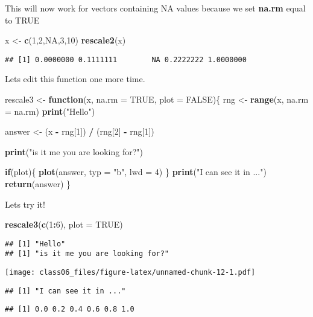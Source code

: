 \documentclass[]{article}
\newenvironment{Shaded}{\begin{snugshade}}{\end{snugshade}}
\newcommand{\KeywordTok}[1]{\textcolor[rgb]{0.13,0.29,0.53}{\textbf{#1}}}
\newcommand{\DataTypeTok}[1]{\textcolor[rgb]{0.13,0.29,0.53}{#1}}
\newcommand{\DecValTok}[1]{\textcolor[rgb]{0.00,0.00,0.81}{#1}}
\newcommand{\StringTok}[1]{\textcolor[rgb]{0.31,0.60,0.02}{#1}}
\newcommand{\OtherTok}[1]{\textcolor[rgb]{0.56,0.35,0.01}{#1}}
\newcommand{\ControlFlowTok}[1]{\textcolor[rgb]{0.13,0.29,0.53}{\textbf{#1}}}
\newcommand{\OperatorTok}[1]{\textcolor[rgb]{0.81,0.36,0.00}{\textbf{#1}}}
\newcommand{\NormalTok}[1]{#1}
\begin{document}
This will now work for vectors containing NA values because we set
\textbf{na.rm} equal to TRUE

\begin{Shaded}
\begin{Highlighting}[]
\NormalTok{x <-}\StringTok{ }\KeywordTok{c}\NormalTok{(}\DecValTok{1}\NormalTok{,}\DecValTok{2}\NormalTok{,}\OtherTok{NA}\NormalTok{,}\DecValTok{3}\NormalTok{,}\DecValTok{10}\NormalTok{)}
\KeywordTok{rescale2}\NormalTok{(x)}
\end{Highlighting}
\end{Shaded}

\begin{verbatim}
## [1] 0.0000000 0.1111111        NA 0.2222222 1.0000000
\end{verbatim}

Lets edit this function one more time.

\begin{Shaded}
\begin{Highlighting}[]
\NormalTok{rescale3 <-}\StringTok{ }\ControlFlowTok{function}\NormalTok{(x, }\DataTypeTok{na.rm =} \OtherTok{TRUE}\NormalTok{, }\DataTypeTok{plot =} \OtherTok{FALSE}\NormalTok{)\{}
\NormalTok{  rng <-}\StringTok{ }\KeywordTok{range}\NormalTok{(x, }\DataTypeTok{na.rm =}\NormalTok{ na.rm)}
  \KeywordTok{print}\NormalTok{(}\StringTok{"Hello"}\NormalTok{)}
  
\NormalTok{  answer <-}\StringTok{ }\NormalTok{(x }\OperatorTok{-}\StringTok{ }\NormalTok{rng[}\DecValTok{1}\NormalTok{]) }\OperatorTok{/}\StringTok{ }\NormalTok{(rng[}\DecValTok{2}\NormalTok{] }\OperatorTok{-}\StringTok{ }\NormalTok{rng[}\DecValTok{1}\NormalTok{])}
  
  \KeywordTok{print}\NormalTok{(}\StringTok{"is it me you are looking for?"}\NormalTok{)}
  
  \ControlFlowTok{if}\NormalTok{(plot)\{}
    \KeywordTok{plot}\NormalTok{(answer, }\DataTypeTok{typ =} \StringTok{"b"}\NormalTok{, }\DataTypeTok{lwd =} \DecValTok{4}\NormalTok{)}
\NormalTok{  \}}
  \KeywordTok{print}\NormalTok{(}\StringTok{"I can see it in ..."}\NormalTok{)}
  \KeywordTok{return}\NormalTok{(answer)}
\NormalTok{\}}
\end{Highlighting}
\end{Shaded}

Lets try it!

\begin{Shaded}
\begin{Highlighting}[]
\KeywordTok{rescale3}\NormalTok{(}\KeywordTok{c}\NormalTok{(}\DecValTok{1}\OperatorTok{:}\DecValTok{6}\NormalTok{), }\DataTypeTok{plot =} \OtherTok{TRUE}\NormalTok{)}
\end{Highlighting}
\end{Shaded}

\begin{verbatim}
## [1] "Hello"
## [1] "is it me you are looking for?"
\end{verbatim}

\texttt{[image: class06\_files/figure-latex/unnamed-chunk-12-1.pdf]}

\begin{verbatim}
## [1] "I can see it in ..."
\end{verbatim}

\begin{verbatim}
## [1] 0.0 0.2 0.4 0.6 0.8 1.0
\end{verbatim}
\end{document}
